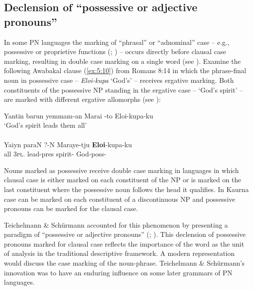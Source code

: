 \subsection{Declension of ``possessive or adjective pronouns''}
\label{sec:key:5.3.3}

In some PN languages the marking of “phrasal” or “adnominal” case -- e.g., possessive or proprietive functions (\citealt[9]{dixon_introduction_1976}; \citeyear[141]{dixon_preface_2002}) -- occurs directly before clausal case marking, resulting in double case marking on a single word (see \citealt{austin_double_1995}). Examine the following Awabakal clause (\ref{ex:5:10}) from Romans 8:14 in which the phrase-final noun in possessive case – \textit{Eloi-kupa} `God’s' – receives ergative marking. Both constituents of the possessive NP standing in the ergative case – `God’s spirit' – are marked with different ergative allomorphs (see \citealt[26]{lissarrague_salvage_2006}):

\ea\label{ex:5:10}
Yantin   barun            yemmam-an         Marai -to             Eloi-kupa-ku \\
\glt `God’s spirit leads them all' \\
\citep{threlkeld_australian_1834} \\
\gll Yaiyn   paraN            ?-N                  Maraye-tju      \textbf{Eloi}-kupa-ku \\
        all           3\textsc{pl}. 	  lead-pres           spirit-       God-poss-\\
\z


\hspace*{-2.7pt}Nouns marked as possessive receive double case marking in languages in which clausal case is either marked on each constituent of the NP or is marked on the last constituent where the possessive noun follows the head it qualifies. In Kaurna case can be marked on each constituent of a discontinuous NP \citep[115, 132]{amery_kulurdu_2013} and possessive pronouns can be marked for the clausal case.

Teichelmann \& Schürmann accounted for this phenomenon by presenting a paradigm of “possessive or adjective pronouns” (\citeyear[11--12]{teichelmann_outlines_1840}; ). This declension of possessive pronouns marked for clausal case reflects the importance of the word as the unit of analysis in the traditional descriptive framework. A modern representation would discuss the case marking of the noun-phrase. Teichelmann \& Schürmann’s innovation was to have an enduring influence on some later grammars of PN languages.

